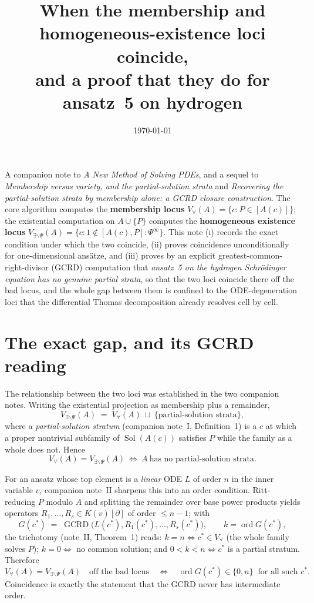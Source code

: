 \documentclass[11pt]{article}
\title{When the membership and homogeneous-existence loci coincide,\\
       and a proof that they do for ansatz~5 on hydrogen}
\author{}
\date{\today}
\DeclareMathOperator{\Sol}{Sol}
\DeclareMathOperator{\GCRD}{GCRD}
\DeclareMathOperator{\ord}{ord}
\newcommand{\Vall}{V_{\forall}}
\newcommand{\Vex}{V_{\exists\backslash\Psi}}
\begin{document}
\maketitle

\noindent
A companion note to \emph{A New Method of Solving PDEs}, and a sequel to
\emph{Membership versus variety, and the partial-solution strata} and
\emph{Recovering the partial-solution strata by membership alone: a GCRD closure
construction}. The core algorithm computes the \textbf{membership locus}
$\Vall(A)=\{c:P\in[A(c)]\}$; the existential computation on $A\cup\{P\}$ computes
the \textbf{homogeneous existence locus} $\Vex(A)=\{c:1\notin[A(c),P]:\Psi^\infty\}$.
This note (i) records the exact condition under which the two coincide, (ii)
proves coincidence unconditionally for one-dimensional ans\"atze, and (iii)
proves by an explicit greatest-common-right-divisor (GCRD) computation that
\emph{ansatz~5 on the hydrogen Schr\"odinger equation has no genuine partial
strata}, so that the two loci coincide there off the bad locus, and the whole
gap between them is confined to the ODE-degeneration loci that the differential
Thomas decomposition already resolves cell by cell.

\section{The exact gap, and its GCRD reading}

The relationship between the two loci was established in the two companion
notes. Writing the existential projection as membership plus a remainder,
\begin{equation}
\label{eq:gap}
\Vex(A) \;=\; \Vall(A)\ \sqcup\ \{\text{partial-solution strata}\},
\end{equation}
where a \emph{partial-solution stratum} (companion note~I, Definition~1) is a
$c$ at which a proper nontrivial subfamily of $\Sol(A(c))$ satisfies $P$ while
the family as a whole does not. Hence
\begin{equation}
\label{eq:coincide}
\boxed{\ \Vall(A)=\Vex(A)\ \iff\ A\ \text{has no partial-solution strata.}\ }
\end{equation}

For an ansatz whose top element is a \emph{linear} ODE $L$ of order $n$ in the
inner variable $v$, companion note~II sharpens this into an order condition.
Ritt-reducing $P$ modulo $A$ and splitting the remainder over base power
products yields operators $R_1,\dots,R_s\in K(v)[\partial]$ of order $\le n-1$;
with
\[
G(c^*)\;=\;\GCRD\big(L(c^*),R_1(c^*),\dots,R_s(c^*)\big),\qquad k=\ord G(c^*),
\]
the trichotomy (note~II, Theorem~1) reads: $k=n\iff c^*\in\Vall$ (the whole
family solves $P$); $k=0\iff$ no common solution; and $0<k<n\iff c^*$ is a
partial stratum. Therefore
\begin{equation}
\label{eq:gcrd-coincide}
\Vall(A)=\Vex(A)\quad\text{off the bad locus}\quad\iff\quad
\ord G(c^*)\in\{0,n\}\ \text{ for all such }c^* .
\end{equation}
Coincidence is exactly the statement that the GCRD never has intermediate
order.
\end{document}
